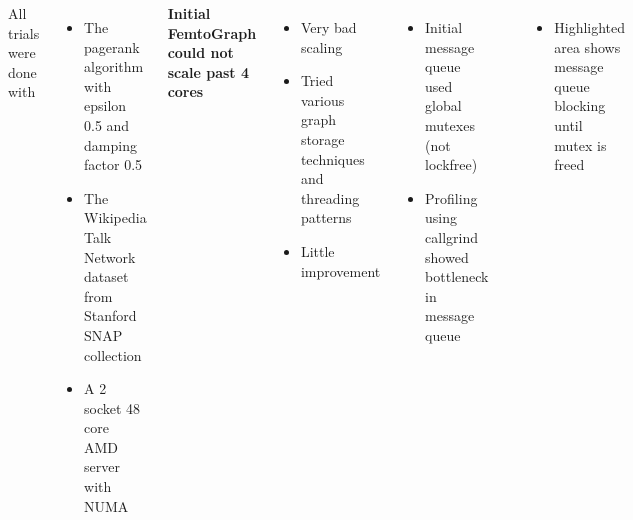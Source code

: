 \documentclass[25pt, portrait,  margin=0mm, innermargin=15mm,
  blockverticalspace=15mm, colspace=15mm, subcolspace=8mm]{tikzposter}
\begin{document}
\begin{columns}
{    }

    
     {
      All trials were done with
      \begin{itemize}
      \item The pagerank algorithm with epsilon 0.5 and damping factor 0.5
      \item The Wikipedia Talk Network dataset from Stanford SNAP collection
      \item A 2 socket 48 core AMD server with NUMA
        
      \end{itemize}
    }

     {
      \textbf{Initial FemtoGraph could not scale past 4 cores}
      \begin{itemize}
      \item  Very bad scaling
      \item Tried various graph storage techniques and threading patterns
      \item Little improvement
      \end{itemize}
      \begin{itemize}
      \item Initial message queue used global mutexes (not lockfree) 
      \item Profiling using callgrind showed bottleneck in message queue
      \end{itemize}
      \setcounter{figurecounter}{98}
      \begin{tikzfigure}
        \includegraphics[width=0.85\linewidth]{callgrind.png}
      \end{tikzfigure}
      \begin{itemize}
      \item Highlighted area shows message queue blocking until mutex is freed
      \end{itemize}
      

      }
    

\end{columns}
\end{document}
